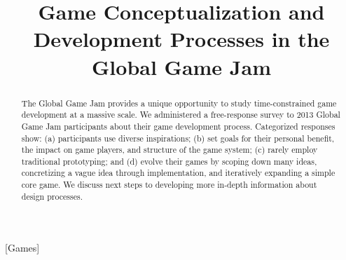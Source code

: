 \documentclass{sig-alternate}
\begin{document}

\title{Game Conceptualization and Development Processes in the Global Game Jam}

\author{}

\maketitle
\begin{abstract}
The Global Game Jam provides a unique opportunity to study time-constrained game development at a massive scale.
We administered a free-response survey to 2013 Global Game Jam participants about their game development process.
Categorized responses show: 
(a) participants use diverse inspirations; 
(b) set goals for their personal benefit, the impact on game players, and structure of the game system; 
(c) rarely employ traditional prototyping; and 
(d) evolve their games by scoping down many ideas, concretizing a vague idea through implementation, and iteratively expanding a simple core game.
We discuss next steps to developing more in-depth information about design processes.
\end{abstract}

[Games]
\end{document}
